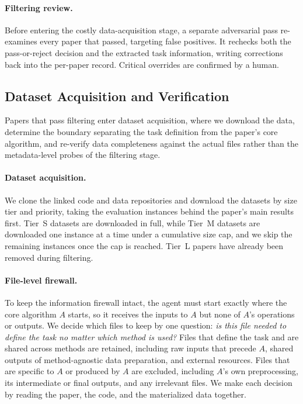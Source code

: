 \documentclass{llmxive}
\begin{document}
\paragraph{Filtering review.}
Before entering the costly data-acquisition stage, a separate adversarial pass re-examines every paper that passed, targeting false positives.
It rechecks both the pass-or-reject decision and the extracted task information, writing corrections back into the per-paper record. Critical overrides are confirmed by a human.


\subsection{Dataset Acquisition and Verification}
\label{sec:gym:data}


Papers that pass filtering enter dataset acquisition, where we download the data, determine the boundary separating the task definition from the paper's core algorithm, and re-verify data completeness against the actual files rather than the metadata-level probes of the filtering stage.

\paragraph{Dataset acquisition.}
We clone the linked code and data repositories and download the datasets by size tier and priority, taking the evaluation instances behind the paper's main results first.
Tier~S datasets are downloaded in full, while Tier~M datasets are downloaded one instance at a time under a cumulative size cap, and we skip the remaining instances once the cap is reached. Tier~L papers have already been
removed during filtering.

\paragraph{File-level firewall.}
To keep the information firewall intact, the agent must start exactly where the core algorithm $A$ starts, so it receives the inputs to $A$ but none of $A$'s operations or outputs.
We decide which files to keep by one question: \emph{is this file needed to define the task no matter which method is used?}
Files that define the task and are shared across methods are retained, including raw inputs that precede $A$, shared outputs of method-agnostic data preparation, and external resources.
Files that are specific to $A$ or produced by $A$ are excluded, including $A$'s own preprocessing, its intermediate or final outputs, and any irrelevant files.
We make each decision by reading the paper, the code, and the materialized data together.
\end{document}
